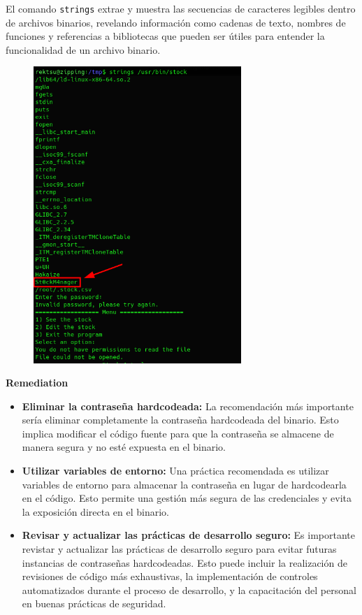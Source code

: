 \documentclass[a4paper]{article} %
\begin{document}
    \begin{definicion}
    El comando \texttt{strings} extrae y muestra las secuencias de caracteres legibles dentro de archivos binarios, revelando información como cadenas de texto, nombres de funciones y referencias a bibliotecas que pueden ser útiles para entender la funcionalidad de un archivo binario.
    \end{definicion}

    \clearpage

    \begin{figure}[h]
        \centering
        \includegraphics[width=0.70\textwidth]{images/stockmanager.png}
    \end{figure}

    \textbf{Remediation}
        
    \begin{itemize}
        \item \textbf{Eliminar la contraseña hardcodeada:} La recomendación más importante sería eliminar completamente la contraseña hardcodeada del binario. Esto implica modificar el código fuente para que la contraseña se almacene de manera segura y no esté expuesta en el binario.
        \item \textbf{Utilizar variables de entorno:}
        Una práctica recomendada es utilizar variables de entorno para almacenar la contraseña en lugar de hardcodearla en el código. Esto permite una gestión más segura de las credenciales y evita la exposición directa en el binario.
        \item \textbf{Revisar y actualizar las prácticas de desarrollo seguro:}
        Es importante revistar y actualizar las prácticas de desarrollo seguro para evitar futuras instancias de contraseñas hardcodeadas. Esto puede incluir la realización de revisiones de código más exhaustivas, la implementación de controles automatizados durante el proceso de desarrollo, y la capacitación del personal en buenas prácticas de seguridad.
    \end{itemize}
\end{document}

